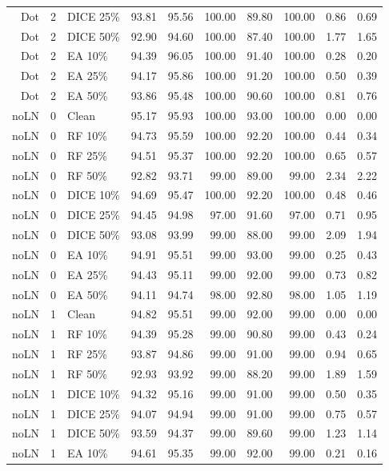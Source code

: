 {\begin{longtable}{rllrrrrrrr}
Dot & 2 & DICE 25\% & 93.81 & 95.56 & 100.00 & 89.80 & 100.00 & 0.86 & 0.69 \\
Dot & 2 & DICE 50\% & 92.90 & 94.60 & 100.00 & 87.40 & 100.00 & 1.77 & 1.65 \\
Dot & 2 & EA 10\% & 94.39 & 96.05 & 100.00 & 91.40 & 100.00 & 0.28 & 0.20 \\
Dot & 2 & EA 25\% & 94.17 & 95.86 & 100.00 & 91.20 & 100.00 & 0.50 & 0.39 \\
Dot & 2 & EA 50\% & 93.86 & 95.48 & 100.00 & 90.60 & 100.00 & 0.81 & 0.76 \\
noLN & 0 & Clean & 95.17 & 95.93 & 100.00 & 93.00 & 100.00 & 0.00 & 0.00 \\
noLN & 0 & RF 10\% & 94.73 & 95.59 & 100.00 & 92.20 & 100.00 & 0.44 & 0.34 \\
noLN & 0 & RF 25\% & 94.51 & 95.37 & 100.00 & 92.20 & 100.00 & 0.65 & 0.57 \\
noLN & 0 & RF 50\% & 92.82 & 93.71 & 99.00 & 89.00 & 99.00 & 2.34 & 2.22 \\
noLN & 0 & DICE 10\% & 94.69 & 95.47 & 100.00 & 92.20 & 100.00 & 0.48 & 0.46 \\
noLN & 0 & DICE 25\% & 94.45 & 94.98 & 97.00 & 91.60 & 97.00 & 0.71 & 0.95 \\
noLN & 0 & DICE 50\% & 93.08 & 93.99 & 99.00 & 88.00 & 99.00 & 2.09 & 1.94 \\
noLN & 0 & EA 10\% & 94.91 & 95.51 & 99.00 & 93.00 & 99.00 & 0.25 & 0.43 \\
noLN & 0 & EA 25\% & 94.43 & 95.11 & 99.00 & 92.00 & 99.00 & 0.73 & 0.82 \\
noLN & 0 & EA 50\% & 94.11 & 94.74 & 98.00 & 92.80 & 98.00 & 1.05 & 1.19 \\
noLN & 1 & Clean & 94.82 & 95.51 & 99.00 & 92.00 & 99.00 & 0.00 & 0.00 \\
noLN & 1 & RF 10\% & 94.39 & 95.28 & 99.00 & 90.80 & 99.00 & 0.43 & 0.24 \\
noLN & 1 & RF 25\% & 93.87 & 94.86 & 99.00 & 91.00 & 99.00 & 0.94 & 0.65 \\
noLN & 1 & RF 50\% & 92.93 & 93.92 & 99.00 & 88.20 & 99.00 & 1.89 & 1.59 \\
noLN & 1 & DICE 10\% & 94.32 & 95.16 & 99.00 & 91.00 & 99.00 & 0.50 & 0.35 \\
noLN & 1 & DICE 25\% & 94.07 & 94.94 & 99.00 & 91.00 & 99.00 & 0.75 & 0.57 \\
noLN & 1 & DICE 50\% & 93.59 & 94.37 & 99.00 & 89.60 & 99.00 & 1.23 & 1.14 \\
noLN & 1 & EA 10\% & 94.61 & 95.35 & 99.00 & 92.00 & 99.00 & 0.21 & 0.16 \\

\end{longtable}}
